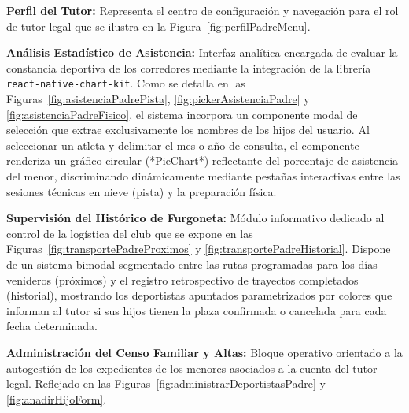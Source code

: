 \newpage
\noindent \textbf{Perfil del Tutor:} Representa el centro de configuración y navegación para el rol de tutor legal que se ilustra en la Figura~\ref{fig:perfilPadreMenu}. \par \smallskip

\noindent \textbf{Análisis Estadístico de Asistencia:} Interfaz analítica encargada de evaluar la constancia deportiva de los corredores mediante la integración de la librería \texttt{react-native-chart-kit}. Como se detalla en las Figuras~\ref{fig:asistenciaPadrePista}, \ref{fig:pickerAsistenciaPadre} y \ref{fig:asistenciaPadreFisico}, el sistema incorpora un componente modal de selección que extrae exclusivamente los nombres de los hijos del usuario. Al seleccionar un atleta y delimitar el mes o año de consulta, el componente renderiza un gráfico circular (*PieChart*) reflectante del porcentaje de asistencia del menor, discriminando dinámicamente mediante pestañas interactivas entre las sesiones técnicas en nieve (pista) y la preparación física. \par \smallskip

\noindent \textbf{Supervisión del Histórico de Furgoneta:} Módulo informativo dedicado al control de la logística del club que se expone en las Figuras~\ref{fig:transportePadreProximos} y \ref{fig:transportePadreHistorial}. Dispone de un sistema bimodal segmentado entre las rutas programadas para los días venideros (próximos) y el registro retrospectivo de trayectos completados (historial), mostrando los deportistas apuntados parametrizados por colores que informan al tutor si sus hijos tienen la plaza confirmada o cancelada para cada fecha determinada. \par \smallskip

\noindent \textbf{Administración del Censo Familiar y Altas:} Bloque operativo orientado a la autogestión de los expedientes de los menores asociados a la cuenta del tutor legal. Reflejado en las Figuras~\ref{fig:administrarDeportistasPadre} y \ref{fig:anadirHijoForm}.

